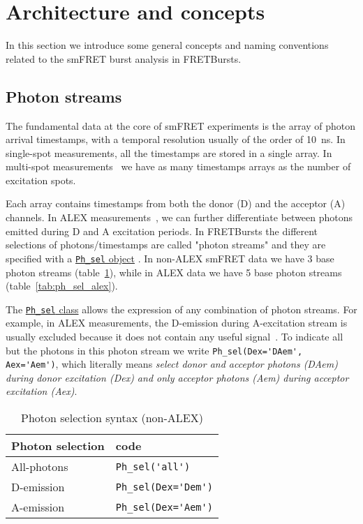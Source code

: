 \section{Architecture and concepts}
\label{sec:concepts}

In this section we introduce some general concepts and naming conventions related 
to the smFRET burst analysis in FRETBursts.

\subsection{Photon streams}
\label{sec:ph_streams}

The fundamental data at the core of smFRET experiments is the array of photon
arrival timestamps, with a temporal resolution usually of the order of 10~ns. In single-spot
measurements, all the timestamps are stored in a single array. In multi-spot
measurements~\cite{Ingargiola_2013} we have as many timestamps arrays as the number of excitation
spots.

Each array contains timestamps from both the donor (D) and the
acceptor (A) channels. In ALEX measurements~\cite{Lee_2005}, we can further 
differentiate between
photons emitted during D and A excitation periods. In FRETBursts the different
selections of photons/timestamps are called "photon streams" and they are
specified with a
\href{http://fretbursts.readthedocs.org/en/latest/ph_sel.html}{\texttt{Ph\_sel}
object} . In non-ALEX smFRET data we have 3 base photon streams
(table~\ref{tab:ph_sel_smfret}), while in ALEX data we have 5 base photon
streams (table~\ref{tab:ph_sel_alex}).

The
\href{http://fretbursts.readthedocs.org/en/latest/ph_sel.html}{\texttt{Ph\_sel}
class} allows the expression of any combination of photon streams. 
For example, in ALEX measurements, the D-emission during A-excitation stream is
usually excluded because it does not contain any useful signal~\cite{Lee_2005}.
To indicate all but the photons in this photon stream we write
\verb|Ph_sel(Dex='DAem', Aex='Aem')|, which literally means \textit{select donor
and acceptor photons (DAem) during donor excitation (Dex) and only acceptor
photons (Aem) during acceptor excitation (Aex)}.

\begin{table}
\begin{tabular}{l|l}
  Photon selection  & code \\
  \hline
  All-photons       & \verb|Ph_sel('all')|\\
  D-emission    & \verb|Ph_sel(Dex='Dem')|\\
  A-emission & \verb|Ph_sel(Dex='Aem')|\\
\end{tabular}
\caption{\label{tab:ph_sel_smfret}Photon selection syntax (non-ALEX)}
\end{table}


